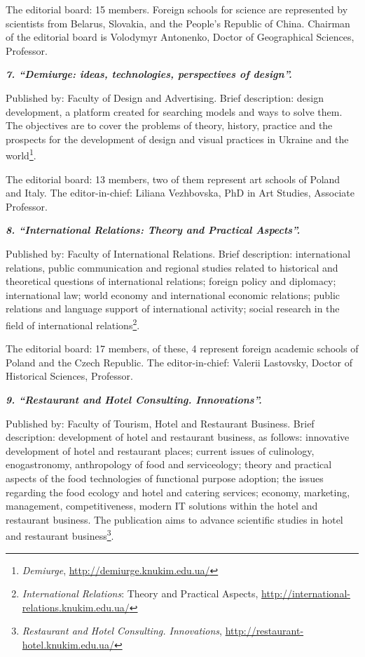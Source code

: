 \documentclass[a4paper,
fontsize=11pt,
oneside,
numbers=noperiodatend,
parskip=half-,
bibliography=totoc,
final
]{scrartcl}
\begin{document}
The editorial board: 15 members. Foreign schools for science are
represented by scientists from Belarus, Slovakia, and the People's
Republic of China. Chairman of the editorial board is Volodymyr
Antonenko, Doctor of Geographical Sciences, Professor.

\textbf{\emph{7. \enquote{Demiurge: ideas, technologies, perspectives of
design}.}}

Published by: Faculty of Design and Advertising. Brief description:
design development, a platform created for searching models and ways to
solve them. The objectives are to cover the problems of theory, history,
practice and the prospects for the development of design and visual
practices in Ukraine and the world\footnote{\emph{Demiurge},
  \url{http://demiurge.knukim.edu.ua/}}.

The editorial board: 13 members, two of them represent art schools of
Poland and Italy. The editor-in-chief: Liliana Vezhbovska, PhD in Art
Studies, Associate Professor.

\textbf{\emph{8. \enquote{International Relations: Theory and Practical
Aspects}.}}

Published by: Faculty of International Relations. Brief description:
international relations, public communication and regional studies
related to historical and theoretical questions of international
relations; foreign policy and diplomacy; international law; world
economy and international economic relations; public relations and
language support of international activity; social research in the field
of international relations\footnote{\emph{International Relations}:
  Theory and Practical Aspects,
  \url{http://international-relations.knukim.edu.ua/}}.

The editorial board: 17 members, of these, 4 represent foreign academic
schools of Poland and the Czech Republic. The editor-in-chief: Valerii
Lastovsky, Doctor of Historical Sciences, Professor.

\textbf{\emph{9. \enquote{Restaurant and Hotel Consulting.
Innovations}.}}

Published by: Faculty of Tourism, Hotel and Restaurant Business. Brief
description: development of hotel and restaurant business, as follows:
innovative development of hotel and restaurant places; current issues of
culinology, enogastronomy, anthropology of food and serviceology; theory
and practical aspects of the food technologies of functional purpose
adoption; the issues regarding the food ecology and hotel and catering
services; economy, marketing, management, competitiveness, modern IT
solutions within the hotel and restaurant business. The publication aims
to advance scientific studies in hotel and restaurant
business\footnote{\emph{Restaurant and Hotel Consulting. Innovations},
  \url{http://restaurant-hotel.knukim.edu.ua/}}.
\end{document}
